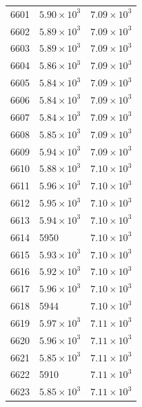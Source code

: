 \begin{table}[H]
\begin{tabular}{lll}
6601 & $\displaystyle 5.90 \times 10^{3}$ & $\displaystyle 7.09 \times 10^{3}$ \\
6602 & $\displaystyle 5.89 \times 10^{3}$ & $\displaystyle 7.09 \times 10^{3}$ \\
6603 & $\displaystyle 5.89 \times 10^{3}$ & $\displaystyle 7.09 \times 10^{3}$ \\
6604 & $\displaystyle 5.86 \times 10^{3}$ & $\displaystyle 7.09 \times 10^{3}$ \\
6605 & $\displaystyle 5.84 \times 10^{3}$ & $\displaystyle 7.09 \times 10^{3}$ \\
6606 & $\displaystyle 5.84 \times 10^{3}$ & $\displaystyle 7.09 \times 10^{3}$ \\
6607 & $\displaystyle 5.84 \times 10^{3}$ & $\displaystyle 7.09 \times 10^{3}$ \\
6608 & $\displaystyle 5.85 \times 10^{3}$ & $\displaystyle 7.09 \times 10^{3}$ \\
6609 & $\displaystyle 5.94 \times 10^{3}$ & $\displaystyle 7.09 \times 10^{3}$ \\
6610 & $\displaystyle 5.88 \times 10^{3}$ & $\displaystyle 7.10 \times 10^{3}$ \\
6611 & $\displaystyle 5.96 \times 10^{3}$ & $\displaystyle 7.10 \times 10^{3}$ \\
6612 & $\displaystyle 5.95 \times 10^{3}$ & $\displaystyle 7.10 \times 10^{3}$ \\
6613 & $\displaystyle 5.94 \times 10^{3}$ & $\displaystyle 7.10 \times 10^{3}$ \\
6614 & 5950 & $\displaystyle 7.10 \times 10^{3}$ \\
6615 & $\displaystyle 5.93 \times 10^{3}$ & $\displaystyle 7.10 \times 10^{3}$ \\
6616 & $\displaystyle 5.92 \times 10^{3}$ & $\displaystyle 7.10 \times 10^{3}$ \\
6617 & $\displaystyle 5.96 \times 10^{3}$ & $\displaystyle 7.10 \times 10^{3}$ \\
6618 & 5944 & $\displaystyle 7.10 \times 10^{3}$ \\
6619 & $\displaystyle 5.97 \times 10^{3}$ & $\displaystyle 7.11 \times 10^{3}$ \\
6620 & $\displaystyle 5.96 \times 10^{3}$ & $\displaystyle 7.11 \times 10^{3}$ \\
6621 & $\displaystyle 5.85 \times 10^{3}$ & $\displaystyle 7.11 \times 10^{3}$ \\
6622 & 5910 & $\displaystyle 7.11 \times 10^{3}$ \\
6623 & $\displaystyle 5.85 \times 10^{3}$ & $\displaystyle 7.11 \times 10^{3}$ \\

\end{tabular}
\end{table}
